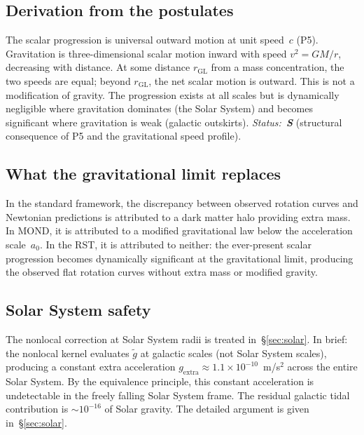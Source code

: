 \documentclass[11pt,a4paper]{article}
\begin{document}
\subsection{Derivation from the postulates}

The scalar progression is universal outward motion at unit speed~$c$ (P5).
Gravitation is three-dimensional scalar motion inward with speed $v^2 = GM/r$, decreasing with distance.
At some distance $r_{\mathrm{GL}}$ from a mass concentration, the two speeds are equal; beyond $r_{\mathrm{GL}}$, the net scalar motion is outward.
This is not a modification of gravity.
The progression exists at all scales but is dynamically negligible where gravitation dominates (the Solar System) and becomes significant where gravitation is weak (galactic outskirts).
\textit{Status:~\textbf{S}} (structural consequence of P5 and the gravitational speed profile).

\subsection{What the gravitational limit replaces}

In the standard framework, the discrepancy between observed rotation curves and Newtonian predictions is attributed to a dark matter halo providing extra mass.
In MOND, it is attributed to a modified gravitational law below the acceleration scale~$a_0$.
In the RST, it is attributed to neither: the ever-present scalar progression becomes dynamically significant at the gravitational limit, producing the observed flat rotation curves without extra mass or modified gravity.

\subsection{Solar System safety}

The nonlocal correction at Solar System radii is treated in~\S\ref{sec:solar}.
In brief: the nonlocal kernel evaluates $\tilde{g}$ at galactic scales (not Solar System scales), producing a constant extra acceleration $g_{\mathrm{extra}} \approx 1.1 \times 10^{-10}$~m/s$^2$ across the entire Solar System.
By the equivalence principle, this constant acceleration is undetectable in the freely falling Solar System frame.
The residual galactic tidal contribution is ${\sim}10^{-16}$ of Solar gravity.
The detailed argument is given in~\S\ref{sec:solar}.

\end{document}
